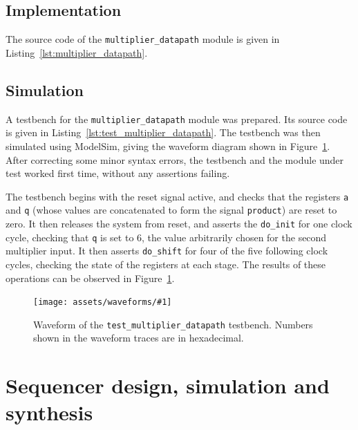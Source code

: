 \documentclass[a4paper]{article}
\newcommand{\waveformfigure}[2]{
  \begin{figure}[bp]
    \centering\texttt{[image: assets/waveforms/\#1]}
    \caption{#2}
    \label{fig:wave:#1}
  \end{figure}
}
\newcommand{\rtlfigure}[2]{
  \begin{figure}[bp]
    \centering\texttt{[image: assets/rtl/\#1]}
    \caption{#2}
    \label{fig:rtl:#1}
  \end{figure}
}
\begin{document}
\subsection{Implementation}
\label{sec:reg:impl}

The source code of the \texttt{multiplier\_datapath} module is given in Listing~\ref{lst:multiplier_datapath}.

\subsection{Simulation}
\label{sec:reg:sim}

A testbench for the \texttt{multiplier\_datapath} module was prepared. Its source code is given in Listing~\ref{lst:test_multiplier_datapath}. The testbench was then simulated using ModelSim, giving the waveform diagram shown in Figure~\ref{fig:wave:test_multiplier_datapath}. After correcting some minor syntax errors, the testbench and the module under test worked first time, without any assertions failing.

The testbench begins with the reset signal active, and checks that the registers \texttt{a} and \texttt{q} (whose values are concatenated to form the signal \texttt{product}) are reset to zero. It then releases the system from reset, and asserts the \texttt{do\_init} for one clock cycle, checking that \texttt{q} is set to 6, the value arbitrarily chosen for the second multiplier input. It then asserts \texttt{do\_shift} for four of the five following clock cycles, checking the state of the registers at each stage. The results of these operations can be observed in Figure~\ref{fig:wave:test_multiplier_datapath}.

\waveformfigure{test_multiplier_datapath}{Waveform of the \texttt{test\_multiplier\_datapath} testbench. Numbers shown in the waveform traces are in hexadecimal.}




\section{Sequencer design, simulation and synthesis}
\label{sec:seq}
\end{document}
